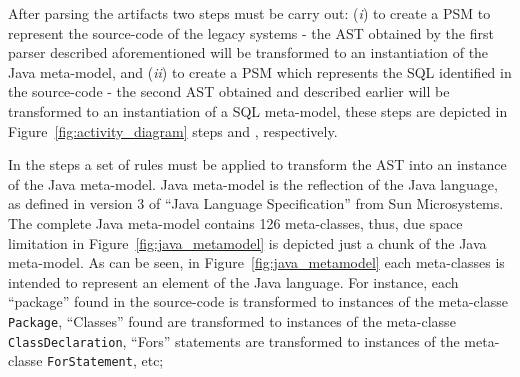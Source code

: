 \documentclass[a4paper,twoside]{article}
\newcommand*\circled[1]{\tikz[baseline=(char.base)]{
  \node[shape=circle,draw, inner sep=0.1pt] (char) {#1};}
}
\begin{document}
After parsing the artifacts two steps must be carry out: (\textit{i}) to create a PSM to represent the source-code of the legacy systems - the AST obtained by the first parser described aforementioned will be transformed to an instantiation of the Java meta-model, and (\textit{ii}) to create a PSM which represents the SQL identified in the source-code - the second AST obtained and described earlier will be transformed to an instantiation of a SQL meta-model, these steps are depicted in Figure~\ref{fig:activity_diagram} steps \circled{\textbf{C}} and \circled{\textbf{D}}, respectively.




In the steps \circled{\textbf{C}} a set of rules must be applied to transform the AST into an instance of the Java meta-model. 
 Java meta-model is the reflection of the Java language, as defined in version 3 of ``Java Language Specification'' from Sun Microsystems. The complete Java meta-model contains 126 meta-classes, thus, due space limitation in Figure~\ref{fig:java_metamodel} is depicted just a chunk of the Java meta-model. As can be seen, in Figure~\ref{fig:java_metamodel} each meta-classes is intended to represent an element of the Java language. For instance, each ``package'' found in the source-code is transformed to instances of the meta-classe \texttt{Package}, ``Classes'' found are transformed to instances of the meta-classe \texttt{ClassDeclaration}, ``Fors'' statements are transformed to instances of the meta-classe \texttt{ForStatement}, etc;
\end{document}
